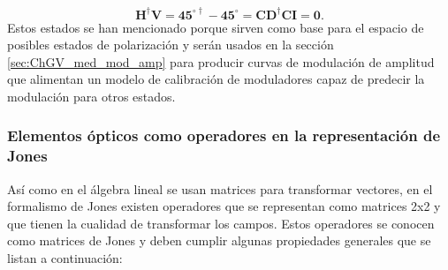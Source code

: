 \begin{equation*}
\mathbf{H^{\dagger}V} = \mathbf{45^{\circ\dagger}-45^{\circ}} =
\mathbf{CD^{\dagger}CI = 0.}   
\end{equation*}
Estos estados se han mencionado porque sirven como base para el espacio
de posibles estados de polarización y serán usados en la sección
\ref{sec:ChGV_med_mod_amp} para producir curvas de modulación de
amplitud que alimentan un modelo de calibración de moduladores capaz
de predecir la modulación para otros estados. 

\subsubsection{Elementos ópticos como operadores en la representación
  de Jones}

Así como en el álgebra lineal se usan matrices para transformar
vectores, en el formalismo de Jones existen operadores que se
representan como matrices 2x2 y que tienen la cualidad de
transformar los campos. Estos operadores se conocen como matrices de
Jones y deben cumplir algunas
propiedades generales  que se listan a continuación:

